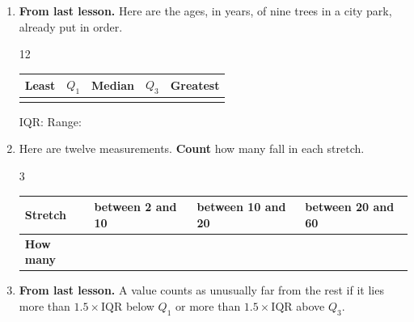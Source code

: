 \begin{enumerate}[leftmargin=1.7em, itemsep=0.13in]

  \item \textbf{From last lesson.} Here are the ages, in years, of nine trees in a city park,
        already put in order.

        \vspace{3pt}
        \begin{center}
        12        
        \end{center}
        \vspace{3pt}

        \renewcommand{\arraystretch}{1.3}
        \begin{tabularx}{\linewidth}{@{} Y Y Y Y Y @{}}
        \textbf{Least} & \textbf{$Q_1$} & \textbf{Median} & \textbf{$Q_3$} & \textbf{Greatest} \\
        \hline
         &  &  &  &  \\
        \end{tabularx}

        \vspace{4pt}
        IQR:  \qquad Range: 

  \item Here are twelve measurements. \textbf{Count} how many fall in each stretch.

        \vspace{3pt}
        \begin{center}
        3           
        \end{center}
        \vspace{3pt}

        \renewcommand{\arraystretch}{1.3}
        \begin{tabularx}{\linewidth}{@{} l Y Y Y @{}}
        \textbf{Stretch} & between 2 and 10 & between 10 and 20 & between 20 and 60 \\
        \hline
        \textbf{How many} &  &  &  \\
        \end{tabularx}

  \item \textbf{From last lesson.} A value counts as unusually far from the rest if it lies more
        than $1.5 \times \text{IQR}$ below $Q_1$ or more than $1.5 \times \text{IQR}$ above $Q_3$.


\end{enumerate}
